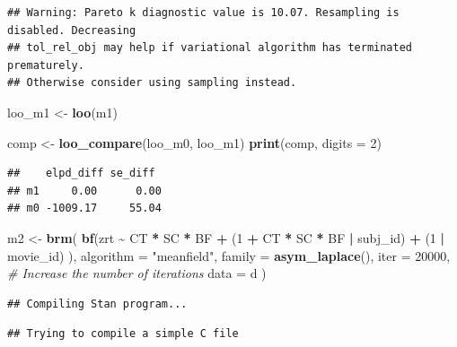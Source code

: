 \documentclass[
]{article}
\newenvironment{Shaded}{\begin{snugshade}}{\end{snugshade}}
\newcommand{\AttributeTok}[1]{\textcolor[rgb]{0.13,0.29,0.53}{#1}}
\newcommand{\CommentTok}[1]{\textcolor[rgb]{0.56,0.35,0.01}{\textit{#1}}}
\newcommand{\DecValTok}[1]{\textcolor[rgb]{0.00,0.00,0.81}{#1}}
\newcommand{\FunctionTok}[1]{\textcolor[rgb]{0.13,0.29,0.53}{\textbf{#1}}}
\newcommand{\NormalTok}[1]{#1}
\newcommand{\OtherTok}[1]{\textcolor[rgb]{0.56,0.35,0.01}{#1}}
\newcommand{\SpecialCharTok}[1]{\textcolor[rgb]{0.81,0.36,0.00}{\textbf{#1}}}
\newcommand{\StringTok}[1]{\textcolor[rgb]{0.31,0.60,0.02}{#1}}
\begin{document}
\begin{verbatim}
## Warning: Pareto k diagnostic value is 10.07. Resampling is disabled. Decreasing
## tol_rel_obj may help if variational algorithm has terminated prematurely.
## Otherwise consider using sampling instead.
\end{verbatim}

\begin{Shaded}
\begin{Highlighting}[]
\NormalTok{loo\_m1 }\OtherTok{\textless{}{-}} \FunctionTok{loo}\NormalTok{(m1)}

\NormalTok{comp }\OtherTok{\textless{}{-}} \FunctionTok{loo\_compare}\NormalTok{(loo\_m0, loo\_m1)}
\FunctionTok{print}\NormalTok{(comp, }\AttributeTok{digits =} \DecValTok{2}\NormalTok{)}
\end{Highlighting}
\end{Shaded}

\begin{verbatim}
##    elpd_diff se_diff 
## m1     0.00      0.00
## m0 -1009.17     55.04
\end{verbatim}

\begin{Shaded}
\begin{Highlighting}[]
\NormalTok{m2 }\OtherTok{\textless{}{-}} \FunctionTok{brm}\NormalTok{(}
  \FunctionTok{bf}\NormalTok{(zrt }\SpecialCharTok{\textasciitilde{}}\NormalTok{ CT }\SpecialCharTok{*}\NormalTok{ SC }\SpecialCharTok{*}\NormalTok{ BF }\SpecialCharTok{+}
\NormalTok{       (}\DecValTok{1} \SpecialCharTok{+}\NormalTok{ CT }\SpecialCharTok{*}\NormalTok{ SC }\SpecialCharTok{*}\NormalTok{ BF }\SpecialCharTok{|}\NormalTok{ subj\_id) }\SpecialCharTok{+}\NormalTok{ (}\DecValTok{1} \SpecialCharTok{|}\NormalTok{ movie\_id)}
\NormalTok{  ), }
  \AttributeTok{algorithm =} \StringTok{"meanfield"}\NormalTok{,}
  \AttributeTok{family =} \FunctionTok{asym\_laplace}\NormalTok{(),}
  \AttributeTok{iter =} \DecValTok{20000}\NormalTok{, }\CommentTok{\# Increase the number of iterations}
  \AttributeTok{data =}\NormalTok{ d}
\NormalTok{)}
\end{Highlighting}
\end{Shaded}

\begin{verbatim}
## Compiling Stan program...
\end{verbatim}

\begin{verbatim}
## Trying to compile a simple C file
\end{verbatim}
\end{document}
